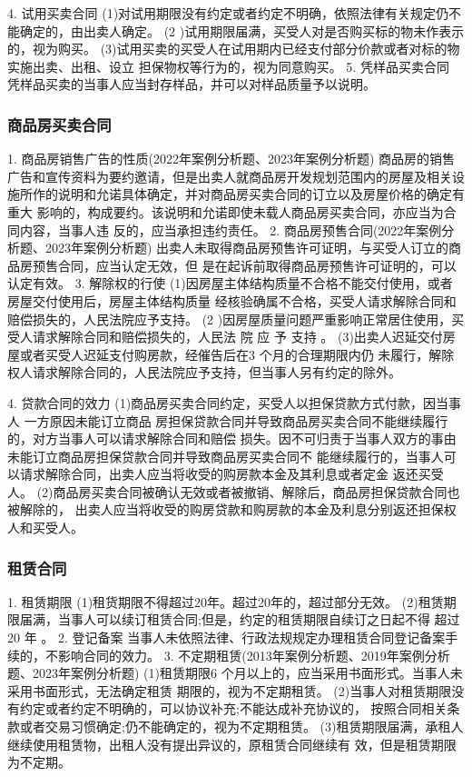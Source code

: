 \documentclass[UTF8,12pt]{ctexart}
\numberwithin{equation}{section} %
\numberwithin{figure}{section}
\numberwithin{table}{section}
\begin{document}
	4. 试用买卖合同 (1)对试用期限没有约定或者约定不明确，依照法律有关规定仍不能确定的，由出卖人确定。 (2 )试用期限届满，买受人对是否购买标的物未作表示的，视为购买。 (3)试用买卖的买受人在试用期内已经支付部分价款或者对标的物实施出卖、出租、设立 担保物权等行为的，视为同意购买。
	5. 凭样品买卖合同
	凭样品买卖的当事人应当封存样品，并可以对样品质量予以说明。
	
	\subsubsection{商品房买卖合同}
	
	1. 商品房销售广告的性质(2022年案例分析题、2023年案例分析题) 商品房的销售广告和宣传资料为要约邀请，但是出卖人就商品房开发规划范围内的房屋及相关设施所作的说明和允诺具体确定，并对商品房买卖合同的订立以及房屋价格的确定有重大 影响的，构成要约。该说明和允诺即使未载人商品房买卖合同，亦应当为合同内容，当事人违 反的，应当承担违约责任。
	2. 商品房预售合同(2022年案例分析题、2023年案例分析题) 出卖人未取得商品房预售许可证明，与买受人订立的商品房预售合同，应当认定无效，但 是在起诉前取得商品房预售许可证明的，可以认定有效。
	3. 解除权的行使 (1)因房屋主体结构质量不合格不能交付使用，或者房屋交付使用后，房屋主体结构质量 经核验确属不合格，买受人请求解除合同和赔偿损失的，人民法院应予支持。
	(2 )因房屋质量问题严重影响正常居住使用，买受人请求解除合同和赔偿损失的，人民法 院 应 予 支持 。
	(3)出卖人迟延交付房屋或者买受人迟延支付购房款，经催告后在3 个月的合理期限内仍 未履行，解除权人请求解除合同的，人民法院应予支持，但当事人另有约定的除外。
	
	
	4. 贷款合同的效力
	(1)商品房买卖合同约定，买受人以担保贷款方式付款，因当事人 一方原因未能订立商品 房担保贷款合同并导致商品房买卖合同不能继续履行的，对方当事人可以请求解除合同和赔偿 损失。因不可归责于当事人双方的事由未能订立商品房担保贷款合同并导致商品房买卖合同不 能继续履行的，当事人可以请求解除合同，出卖人应当将收受的购房款本金及其利息或者定金 返还买受人。 (2)商品房买卖合同被确认无效或者被撤销、解除后，商品房担保贷款合同也被解除的， 出卖人应当将收受的购房贷款和购房款的本金及利息分别返还担保权人和买受人。
	
	\subsubsection{租赁合同}
	
	1. 租赁期限
	(1)租货期限不得超过20年。超过20年的，超过部分无效。 (2)租赁期限届满，当事人可以续订租赁合同;但是，约定的租赁期限自续订之日起不得 超过 20 年 。
	2. 登记备案 当事人未依照法律、行政法规规定办理租赁合同登记备案手续的，不影响合同的效力。
	3. 不定期租赁(2013年案例分析题、2019年案例分析题、2023年案例分析题) (1)租赁期限6 个月以上的，应当采用书面形式。当事人未采用书面形式，无法确定租赁 期限的，视为不定期租赁。 (2)当事人对租赁期限没有约定或者约定不明确的，可以协议补充;不能达成补充协议的， 按照合同相关条款或者交易习惯确定;仍不能确定的，视为不定期租赁。 (3)租赁期限届满，承租人继续使用租赁物，出租人没有提出异议的，原租赁合同继续有 效，但是租赁期限为不定期。
	
\end{document}
